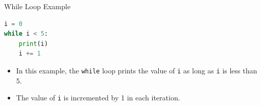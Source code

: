 \documentclass{beamer}
\begin{document}
\begin{frame}[fragile]{While Loop Example}
    \begin{lstlisting}[style=colorful, language=Python]
i = 0
while i < 5:
    print(i)
    i += 1
    \end{lstlisting}
    \begin{itemize}
        \item In this example, the \texttt{while} loop prints the value of \texttt{i} as long as \texttt{i} is less than 5.
        \item The value of \texttt{i} is incremented by 1 in each iteration.
    \end{itemize}
\end{frame}










  
\end{document}
